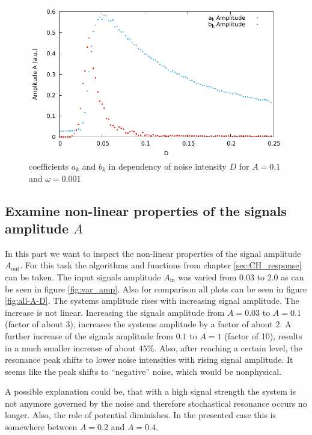 \documentclass[10pt,fleqn,%
reqno,a4paper]{article}
\begin{document}
\begin{figure} 
	\includegraphics[width=\linewidth]{gnuplot_pictures/final_pictures/phase-.pdf}
	\caption{coefficients $a_k$ and $b_k$ in dependency of noise intensity $D$ for $A=0.1$ and $\omega=0.001$}
	\label{pic:phase}
\end{figure}
\newpage
\subsection{Examine non-linear properties of the signals amplitude $ A $}
In this part we want to inspect the non-linear properties of the signal amplitude $ A_{\mathrm{out}} $. 
For this task the algorithms and functions from chapter \ref{sec:CH_response} can be taken. The input signals amplitude $A_{\mathrm{in}}$ was varied from $0.03$ to $2.0$ as can be seen in figure \ref{fig:var_amp}. Also for comparison all plots can be seen in figure \ref{fig:all-A-D}.
The systems amplitude rises with increasing signal amplitude. The increase is not linear. Increasing the signals amplitude from $A=0.03$ to $A=0.1$ (factor of about 3), increases the systems amplitude by a factor of about $2$. A further increase of the signals amplitude from $0.1$ to $A=1$ (factor of 10), results in a much smaller increase of about $45\%$. Also, after reaching a certain level, the resonance peak shifts to lower noise intensities with rising signal amplitude. It seems like the peak shifts to "`negative"' noise, which would be nonphysical.

A possible explanation could be, that with a high signal strength the system is not anymore governed by the noise and therefore stochastical resonance occurs no longer. Also, the role of potential diminishes. In the presented case this is somewhere between $A=0.2$ and $A=0.4$.
\end{document}
